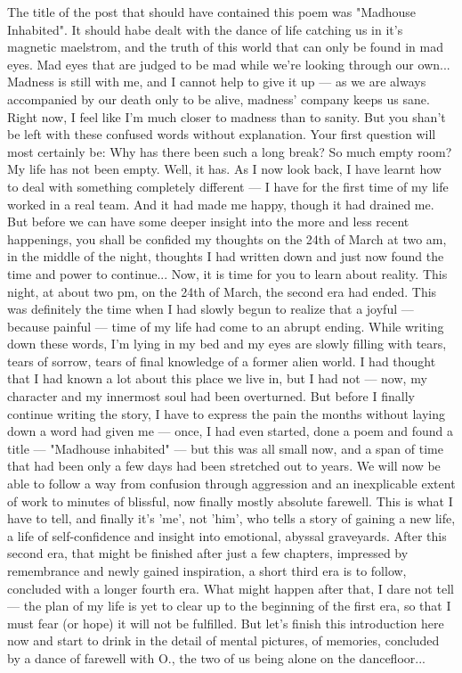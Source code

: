 The title of the post that should have contained this poem was "Madhouse Inhabited". It should habe dealt with the dance of life catching us in it's magnetic maelstrom, and the truth of this world that can only be found in mad eyes. Mad eyes that are judged to be mad while we're looking through our own... 
Madness is still with me, and I cannot help to give it up --- as we are always accompanied by our death only to be alive, madness' company keeps us sane. Right now, I feel like I'm much closer to madness than to sanity. But you shan't be left with these confused words without explanation. 
Your first question will most certainly be: Why has there been such a long break? So much empty room? 
My life has not been empty. Well, it has. As I now look back, I have learnt how to deal with something completely different --- I have for the first time of my life worked in a real team. And it had made me happy, though it had drained me. But before we can have some deeper insight into the more and less recent happenings, you shall be confided my thoughts on the 24th of March at two am, in the middle of the night, thoughts I had written down and just now found the time and power to continue... Now, it is time for you to learn about reality. 
This night, at about two pm, on the 24th of March, the second era had ended. This was definitely the time when I had slowly begun to realize that a joyful --- because painful --- time of my life had come to an abrupt ending. While writing down these words, I'm lying in my bed and my eyes are slowly filling with tears, tears of sorrow, tears of final knowledge of a former alien world. I had thought that I had known a lot about this place we live in, but I had not --- now, my character and my innermost soul had been overturned. But before I finally continue writing the story, I have to express the pain the months without laying down a word had given me --- once, I had even started, done a poem and found a title --- "Madhouse inhabited" --- but this was all small now, and a span of time that had been only a few days had been stretched out to years. We will now be able to follow a way from confusion through aggression and an inexplicable extent of work to minutes of blissful, now finally mostly absolute farewell. This is what I have to tell, and finally it's 'me', not 'him', who tells a story of gaining a new life, a life of self-confidence and insight into emotional, abyssal graveyards. After this second era, that might be finished after just a few chapters, impressed by remembrance and newly gained inspiration, a short third era is to follow, concluded with a longer fourth era. What might happen after that, I dare not tell --- the plan of my life is yet to clear up to the beginning of the first era, so that I must fear (or hope) it will not be fulfilled. But let's finish this introduction here now and start to drink in the detail of mental pictures, of memories, concluded by a dance of farewell with O., the two of us being alone on the dancefloor... 

